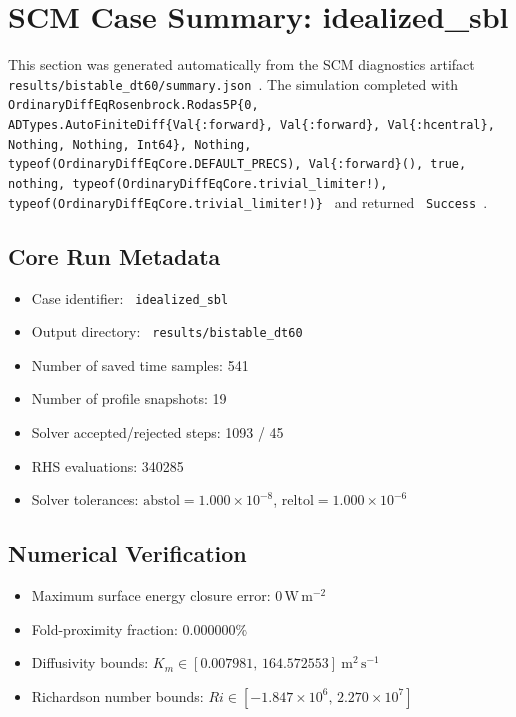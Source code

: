 \section{SCM Case Summary: idealized\_sbl}
\label{sec:scm_case_idealized_sbl}

This section was generated automatically from the SCM diagnostics artifact
\texttt{ results/bistable\_dt60/summary.json }. The simulation completed with \texttt{ OrdinaryDiffEqRosenbrock.Rodas5P\{0, ADTypes.AutoFiniteDiff\{Val\{:forward\}, Val\{:forward\}, Val\{:hcentral\}, Nothing, Nothing, Int64\}, Nothing, typeof(OrdinaryDiffEqCore.DEFAULT\_PRECS), Val\{:forward\}(), true, nothing, typeof(OrdinaryDiffEqCore.trivial\_limiter!), typeof(OrdinaryDiffEqCore.trivial\_limiter!)\} }
and returned \texttt{ Success }.

\subsection{Core Run Metadata}
\begin{itemize}
  \item Case identifier: \texttt{ idealized\_sbl }
  \item Output directory: \texttt{ results/bistable\_dt60 }
  \item Number of saved time samples: 541
  \item Number of profile snapshots: 19
  \item Solver accepted/rejected steps: 1093 / 45
  \item RHS evaluations: 340285
  \item Solver tolerances: $\mathrm{abstol}=1.000 \times 10^{-8}$, $\mathrm{reltol}=1.000 \times 10^{-6}$
\end{itemize}

\subsection{Numerical Verification}
\begin{itemize}
  \item Maximum surface energy closure error:
  $0\,\mathrm{W\,m^{-2}}$
  \item Fold-proximity fraction:
  $0.000000\%$
  \item Diffusivity bounds:
  $K_m \in [0.007981,\,164.572553]~\mathrm{m^2\,s^{-1}}$
  \item Richardson number bounds:
  $Ri \in [-1.847 \times 10^{6},\,2.270 \times 10^{7}]$
\end{itemize}

